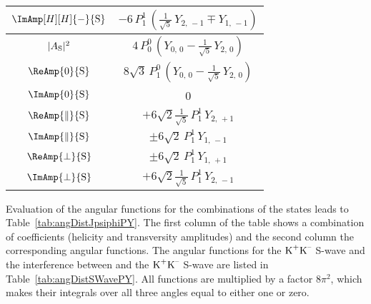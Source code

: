 \begin{table}[p]
\begin{tabular}{cc}
    $\ImAmp[H][H]{-}{{\text{S}}}$  &
      $-6\, P_1^1\, (\tfrac{1}{\sqrt{5}}\, Y_{2,\,-1} \mp Y_{1,\,-1})$  \\
    \hline

    $|{A}_{{\text{S}}}|^2$  &
      $4\, P_0^0\, (Y_{0,\,0} - \tfrac{1}{\sqrt{5}}\, Y_{2,\,0})$  \\

    $\ReAmp{0}{{\text{S}}}$  &
      $8\sqrt{3}\, P_1^0\, (Y_{0,\,0} - \tfrac{1}{\sqrt{5}}\, Y_{2,\,0})$  \\

    $\ImAmp{0}{{\text{S}}}$  &
      0  \\

    $\ReAmp{\parallel}{{\text{S}}}$  &
      $+6\sqrt{2}\tfrac{1}{\sqrt{5}}\, P_1^1\, Y_{2,\,+1}$  \\

    $\ImAmp{\parallel}{{\text{S}}}$  &
      $\pm 6\sqrt{2}\, P_1^1\, Y_{1,\,-1}$  \\

    $\ReAmp{\perp}{{\text{S}}}$  &
      $\pm 6\sqrt{2}\, P_1^1\, Y_{1,\,+1}$  \\

    $\ImAmp{\perp}{{\text{S}}}$  &
      $+6\sqrt{2}\tfrac{1}{\sqrt{5}}\, P_1^1\, Y_{2,\,-1}$  \\
    \hline
  \end{tabular}
\end{table}

Evaluation of the angular functions for the combinations of the \BstoJpsiphi{} states leads to Table~\ref{tab:angDistJpsiphiPY}. The first
column of the table shows a combination of coefficients (helicity and transversity amplitudes) and the second column the corresponding
angular functions. The angular functions for the $\text{K}^\text{+}\text{K}^\text{--}$ S-wave and the interference between \BstoJpsiphi{} and the $\text{K}^\text{+}\text{K}^\text{--}$ S-wave are listed
in Table~\ref{tab:angDistSWavePY}. All functions are multiplied by a factor 8$\pi^\text{2}$, which makes their integrals over all three
angles equal to either one or zero.


